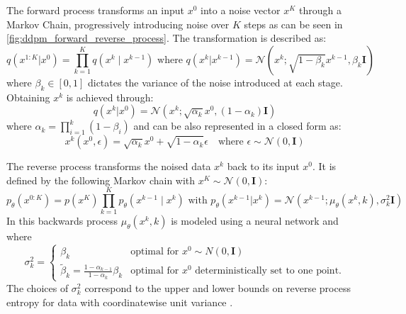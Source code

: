 The forward process transforms an input $x^0$ into a noise vector $x^K$ through a Markov Chain, progressively introducing noise over $K$ steps as can be seen in \autoref{fig:ddpm_forward_reverse_process}. The transformation is described as:
\begin{equation} \label{eq:diff_forward_process}
    q(x^{1:K} | x^0) = \prod_{k=1}^{K} q(x^k \mid x^{k-1}) \text{ where } q(x^k|x^{k-1}) = \mathcal{N}(x^k; \sqrt{1 - \beta_k}x^{k-1}, \beta_k \textbf{I}) 
\end{equation}
where $\beta_k \in [0, 1]$ dictates the variance of the noise introduced at each stage. Obtaining $x^k$ is achieved through:
\begin{equation} 
   q(x^k|x^0) = \mathcal{N}(x^k; \sqrt{\alpha_k}x^0, (1- \alpha_k) \mathbf{I}) 
\end{equation}
where $\alpha_k = \prod_{i=1}^{k}(1 - \beta_i)$ and can be also represented in a closed form as:
\begin{equation} \label{eq:ddpm_get_xk}
   x^k(x^0, \epsilon) = \sqrt{\alpha_k}x^0 + \sqrt{1 - \alpha_k}\epsilon \quad \text{where } \epsilon \sim \mathcal{N}(0, \mathbf{I})
\end{equation}

The reverse process transforms the noised data $x^k$ back to its input $x^0$. It is defined by the following Markov chain with $x^K \sim \mathcal{N} (0, \textbf{I})$:
\begin{equation} \label{eq:diff_reverse_process}
     p_\theta(x^{0:K}) = p(x^K)\prod_{k=1}^{K} p_\theta(x^{k-1} \mid x^k) \text{ with } p_\theta(x^{k-1} | x^k) = \mathcal{N} (x^{k-1}; \mu_\theta(x^k, k), \sigma^2_k \mathbf{I})    
\end{equation}
In this backwards process $\mu_\theta(x^k, k)$ is modeled using a neural network and where
\begin{equation} 
    \sigma^2_k = 
    \begin{cases} 
        \beta_k & \text{optimal for } x^0 \sim N(0, \mathbf{I}) \\
        \tilde{\beta}_k = \frac{1 - \alpha_{k-1}}{1 - \alpha_k} \beta_k & \text{optimal for } x^0 \text{ deterministically set to one point.}
    \end{cases} \label{eq:diff_sigma_squared}
\end{equation}
The choices of $\sigma^2_k$ correspond to the upper and lower bounds on reverse process entropy for data with coordinatewise unit variance \cite{sohl-dickstein_deep_2015}.

